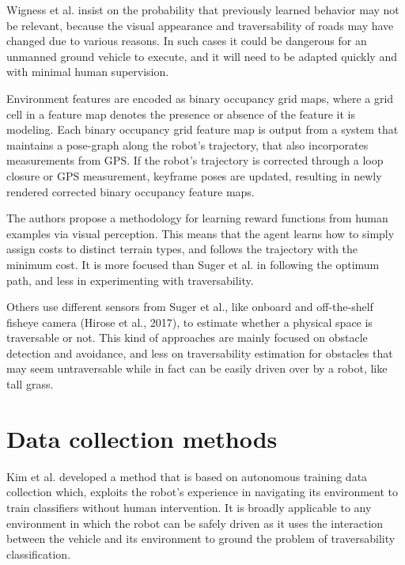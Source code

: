 \documentclass[12pt,a4paper]{report}
\begin{document}
	Wigness et al. \cite{Wigness} insist on the probability that previously learned 
	behavior may not be relevant, because the visual appearance and traversability 
	of roads may have changed due to various reasons. In such cases it could be 
	dangerous for an unmanned ground vehicle to execute, and it will need to be 
	adapted quickly and with minimal human supervision.
	
	Environment features are encoded as binary occupancy grid maps, where 
	a grid cell in a feature map denotes the presence or absence of the feature 
	it is modeling. Each binary occupancy grid feature map is output from a 
	system that maintains a pose-graph along the robot’s trajectory, that also 
	incorporates measurements from GPS. If the robot’s trajectory is corrected 
	through a loop closure or GPS measurement, keyframe poses are updated, 
	resulting in newly rendered corrected binary occupancy feature maps.
	
	The authors propose a methodology for learning reward functions from 
	human examples via visual perception. This means that the agent learns 
	how to simply assign costs to distinct terrain types, and follows the 
	trajectory with the minimum cost. It is more focused than Suger et al. in 
	following the optimum path, and less in experimenting with traversability.
	\newline
	
	Others use different sensors from Suger et al., like onboard and off-the-shelf 
	fisheye camera \cite{Hirose} (Hirose et al., 2017), to estimate whether a physical space 
	is traversable or not. This kind of approaches are mainly focused on obstacle 
	detection and avoidance, and less on traversability estimation for obstacles 
	that may seem untraversable while in fact can be easily driven over by a 
	robot, like tall grass.
	\\
	
	\section{Data collection methods}
	\label{sec:bg:data}
	
	Kim et al. \cite{Kim} developed a method 
	that is based on autonomous training data collection which, exploits the 
	robot’s experience in navigating its environment to train classifiers without 
	human intervention. It is broadly applicable to any environment in which 
	the robot can be safely driven as it uses the interaction between the vehicle
	and its environment to ground the problem of traversability classification.
	
\end{document}
